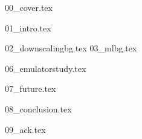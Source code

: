 \documentclass[onecolumn]{article}
\begin{document}

{00_cover.tex}
\pagebreak

{01_intro.tex}

{02_downscalingbg.tex}
{03_mlbg.tex}

{06_emulatorstudy.tex}

{07_future.tex}

{08_conclusion.tex}

{09_ack.tex}

\printbibliography
\end{document}
